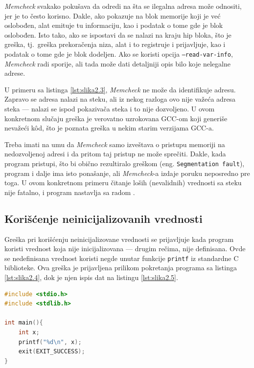 \documentclass[12pt,oneside]{memoir}
\theoremstyle{plain}
\theoremstyle{definition}
\begin{document}
\textit{Memcheck} svakako pokušava da odredi na šta se ilegalna adresa može odnositi, jer je to često korisno. Dakle, ako pokazuje na blok memorije koji je već oslobođen, alat emituje tu informaciju, kao i podatak o tome gde je blok oslobođen. Isto tako, ako se ispostavi da se nalazi na kraju hip bloka, što je greška, tj.~greška prekoračenja niza, alat i to registruje i prijavljuje, kao i podatak o tome gde je blok dodeljen. Ako se koristi opcija \texttt{--read-var-info}, \textit{Memcheck} radi sporije, ali tada može dati detaljniji opis bilo koje nelegalne adrese.

U primeru sa listinga \ref{lst:slika2.3}, \textit{Memcheck} ne može da identifikuje adresu. Zapravo se adresa nalazi na steku, ali iz nekog razloga ovo nije važeća adresa steka --- nalazi se ispod pokazivača steka i to nije dozvoljeno. U ovom konkretnom slučaju greška je verovatno uzrokovana GCC-om koji generiše nevažeći k\^od, što je poznata greška u nekim starim verzijama GCC-a.

Treba imati na umu da \textit{Memcheck} samo izveštava o pristupu memoriji na nedozvoljenoj adresi i da pritom taj pristup ne može sprečiti. Dakle, kada program pristupi, što bi obično rezultiralo greškom (eng. \texttt{Segmentation fault}), program i dalje ima isto ponašanje, ali \textit{Memcheck}-a izdaje poruku neposredno pre toga. U ovom konkretnom primeru čitanje loših (nevalidnih) vrednosti sa steku nije fatalno, i program nastavlja sa radom \cite{Memcheck}. 

\subsection{Korišćenje neinicijalizovanih vrednosti}
Greška pri korišćenju neinicijalizovane vrednosti se prijavljuje kada program koristi vrednost koja nije inicijalizovana --- drugim rečima, nije definisana. Ovde se nedefinisana vrednost koristi negde unutar funkcije \texttt{printf} iz standardne C biblioteke. Ova greška je prijavljena prilikom pokretanja programa sa listinga \ref{lst:slika2.4}, dok je njen ispis dat na listingu \ref{lst:slika2.5}.

\begin{lstlisting}[style=mystyle,caption={Program koji izaziva grešku korišćenja neinicijalizovanih vrednosti}, label={lst:slika2.4},language={C}] 
#include <stdio.h>
#include <stdlib.h>

int main(){
	int x;
	printf("%d\n", x);
	exit(EXIT_SUCCESS);
}
\end{lstlisting}
\end{document}
